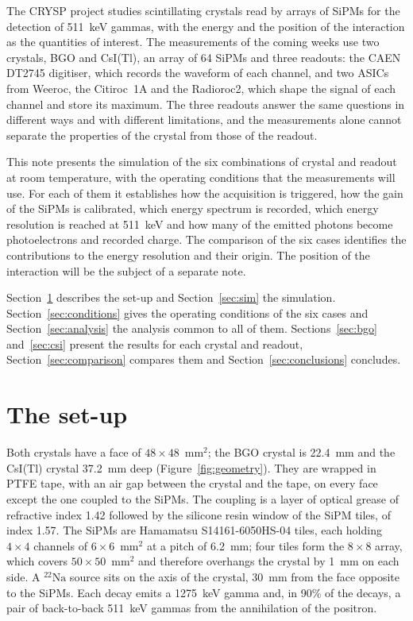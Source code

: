 \documentclass[11pt]{article}
\newcommand{\Na}{\ensuremath{{}^{22}\mathrm{Na}}\xspace}
\newcommand{\csitl}{CsI(Tl)\xspace}
\begin{document}
The CRYSP project studies scintillating crystals read by arrays of SiPMs for
the detection of 511~keV gammas, with the energy and the position of the
interaction as the quantities of interest. The measurements of the coming
weeks use two crystals, BGO and \csitl, an array of 64 SiPMs and three
readouts: the CAEN DT2745 digitiser, which records the waveform of each
channel, and two ASICs from Weeroc, the Citiroc~1A and the Radioroc2, which
shape the signal of each channel and store its maximum. The three readouts
answer the same questions in different ways and with different
limitations, and the measurements alone cannot separate the properties of
the crystal from those of the readout.

This note presents the simulation of the six combinations of crystal and
readout at room temperature, with the operating conditions that the
measurements will use. For each of them it establishes how the
acquisition is triggered, how the gain of the SiPMs is calibrated, which
energy spectrum is recorded, which energy resolution is reached at
511~keV and how many of the emitted photons become photoelectrons and
recorded charge. The comparison of the six cases identifies the
contributions to the energy resolution and their origin. The position of
the interaction will be the subject of a separate note.

Section~\ref{sec:setup} describes the set-up and Section~\ref{sec:sim} the
simulation. Section~\ref{sec:conditions} gives the operating conditions of
the six cases and Section~\ref{sec:analysis} the analysis common to all of
them. Sections~\ref{sec:bgo} and~\ref{sec:csi} present the results for
each crystal and readout, Section~\ref{sec:comparison} compares them and
Section~\ref{sec:conclusions} concludes.

\section{The set-up}
\label{sec:setup}

Both crystals have a face of $48 \times 48$~mm$^2$; the BGO crystal is
22.4~mm and the \csitl crystal 37.2~mm deep (Figure~\ref{fig:geometry}).
They are wrapped in PTFE tape, with an air gap between the crystal and the
tape, on every face except the one coupled to the SiPMs. The coupling is a
layer of optical grease of refractive index 1.42 followed by the silicone
resin window of the SiPM tiles, of index 1.57. The SiPMs are Hamamatsu
S14161-6050HS-04 tiles, each holding $4 \times 4$ channels of
$6 \times 6$~mm$^2$ at a pitch of 6.2~mm; four tiles form the
$8 \times 8$ array, which covers $50 \times 50$~mm$^2$ and therefore
overhangs the crystal by 1~mm on each side. A \Na source sits on the axis
of the crystal, 30~mm from the face opposite to the SiPMs. Each decay emits
a 1275~keV gamma and, in 90\% of the decays, a pair of back-to-back
511~keV gammas from the annihilation of the positron.
\end{document}
